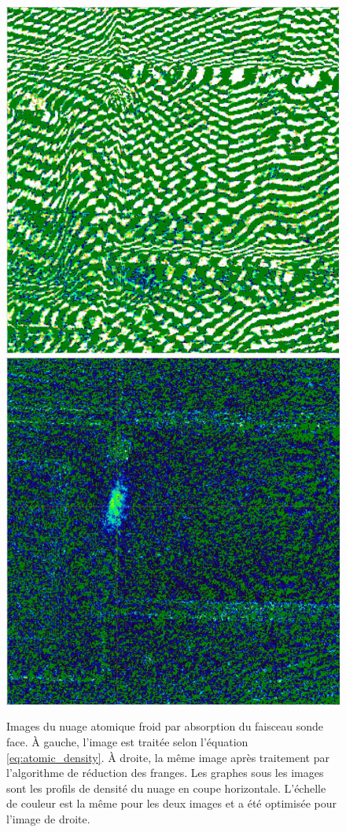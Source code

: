 \begin{figure}[h]
\centering
\includegraphics[width=0.35\linewidth]{figures/setup/coldatoms/Normal_abs2_onlyPic}
\hspace{.15\linewidth}
\includegraphics[width=0.35\linewidth]{figures/setup/coldatoms/RF_abs2_onlyPic}
\caption[Effet de l'algorithme de réduction des franges]{
Images du nuage atomique froid par absorption du faisceau sonde face.
\`A gauche, l'image est traitée selon l'équation \eqref{eq:atomic_density}.
\`A droite, la même image après traitement par l'algorithme de réduction des franges.
Les graphes sous les images sont les profils de densité du nuage en coupe horizontale.
L'échelle de couleur est la même pour les deux images et a été optimisée pour l'image de droite.
}
\label{fig:Fringe_Reduction}
\end{figure}

